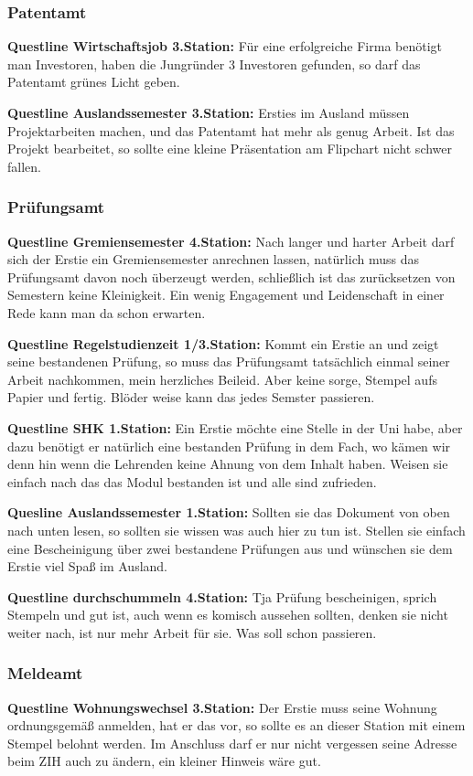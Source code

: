 \subsubsection{Patentamt}
\textbf{Questline Wirtschaftsjob 3.Station:} Für eine erfolgreiche Firma benötigt man Investoren, haben die Jungründer 3 Investoren gefunden, so darf das Patentamt grünes Licht geben.

\textbf{Questline Auslandssemester 3.Station:} Ersties im Ausland müssen Projektarbeiten machen, und das Patentamt hat mehr als genug Arbeit. Ist das Projekt bearbeitet, so sollte eine kleine Präsentation am Flipchart nicht schwer fallen.

\subsubsection{Prüfungsamt}
\textbf{Questline Gremiensemester 4.Station:} Nach langer und harter Arbeit darf sich der Erstie ein Gremiensemester anrechnen lassen, natürlich muss das Prüfungsamt davon noch überzeugt werden, schließlich ist das zurücksetzen von Semestern keine Kleinigkeit. Ein wenig Engagement und Leidenschaft in einer Rede kann man da schon erwarten.

\textbf{Questline Regelstudienzeit 1/3.Station:} Kommt ein Erstie an und zeigt seine bestandenen Prüfung, so muss das Prüfungsamt tatsächlich einmal seiner Arbeit nachkommen, mein herzliches Beileid. Aber keine sorge, Stempel aufs Papier und fertig. Blöder weise kann das jedes Semster passieren.  

\textbf{Questline SHK 1.Station:} Ein Erstie möchte eine Stelle in der Uni habe, aber dazu benötigt er natürlich eine bestanden Prüfung in dem Fach, wo kämen wir denn hin wenn die Lehrenden keine Ahnung von dem Inhalt haben. Weisen sie einfach nach das das Modul bestanden ist und alle sind zufrieden.

\textbf{Quesline Auslandssemester 1.Station:} Sollten sie das Dokument von oben nach unten lesen, so sollten sie wissen was auch hier zu tun ist. Stellen sie einfach eine Bescheinigung über zwei bestandene Prüfungen aus und wünschen sie dem Erstie viel Spaß im Ausland.

\textbf{Questline durchschummeln 4.Station:} Tja Prüfung bescheinigen, sprich Stempeln und gut ist, auch wenn es komisch aussehen sollten, denken sie nicht weiter nach, ist nur mehr Arbeit für sie. Was soll schon passieren.

\subsubsection{Meldeamt}
\textbf{Questline Wohnungswechsel 3.Station:} Der Erstie muss seine Wohnung ordnungsgemäß anmelden, hat er das vor, so sollte es an dieser Station mit einem Stempel belohnt werden. Im Anschluss darf er nur nicht vergessen seine Adresse beim ZIH auch zu ändern, ein kleiner Hinweis wäre gut.
